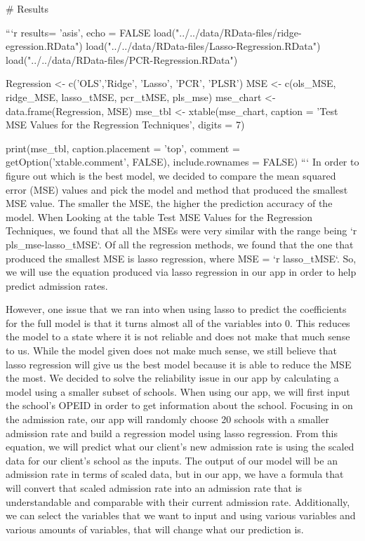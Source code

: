 # Results

```{r results= 'asis', echo = FALSE}
load("../../data/RData-files/ridge-egression.RData")
load("../../data/RData-files/Lasso-Regression.RData")
load("../../data/RData-files/PCR-Regression.RData")

Regression <- c('OLS','Ridge', 'Lasso', 'PCR', 'PLSR')
MSE <- c(ols_MSE, ridge_MSE, lasso_tMSE, pcr_tMSE, pls_mse)
mse_chart <- data.frame(Regression, MSE)
mse_tbl <- xtable(mse_chart,
               caption = 'Test MSE Values for the Regression Techniques',
               digits = 7)

print(mse_tbl, caption.placement = 'top',
      comment = getOption('xtable.comment', FALSE),
      include.rownames = FALSE)
```
In order to figure out which is the best model, we decided to compare the mean squared error (MSE) values and pick the model and method that produced the smallest MSE value. The smaller the MSE, the higher the prediction accuracy of the model. When Looking at the table Test MSE Values for the Regression Techniques, we found that all the MSEs were very similar with the range being `r pls_mse-lasso_tMSE`. Of all the regression methods, we found that the one that produced the smallest MSE is lasso regression, where MSE = `r lasso_tMSE`. So, we will use the equation produced via lasso regression in our app in order to help predict admission rates.

However, one issue that we ran into when using lasso to predict the coefficients for the full model is that it turns almost all of the variables into 0. This reduces the model to a state where it is not reliable and does not make that much sense to us. While the model given does not make much sense, we still believe that lasso regression will give us the best model because it is able to reduce the MSE the most. We decided to solve the reliability issue in our app by calculating a model using a smaller subset of schools. When using our app, we will first input the school's OPEID in order to get information about the school. Focusing in on the admission rate, our app will randomly choose 20 schools with a smaller admission rate and build a regression model using lasso regression. From this equation, we will predict what our client's new admission rate is using the scaled data for our client's school as the inputs. The output of our model will be an admission rate in terms of scaled data, but in our app, we have a formula that will convert that scaled admission rate into an admission rate that is understandable and comparable with their current admission rate. Additionally, we can select the variables that we want to input and using various variables and various amounts of variables, that will change what our prediction is.

